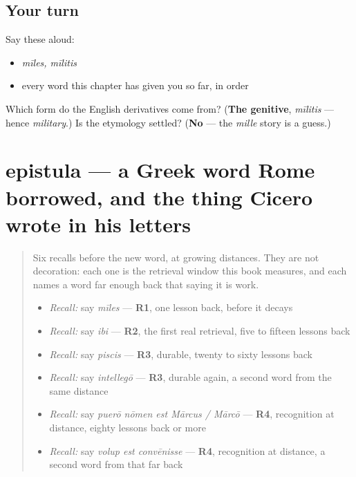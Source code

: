 \subsection*{Your turn}
Say these aloud:

\begin{itemize}
\raggedright
  \item \emph{mīles, mīlitis}
  \item every word this chapter has given you so far, in order
\end{itemize}

\begin{tcolorbox}[breakable,colback=teal!4,colframe=teal!35!black,title={Before you move on}]
Which form do the English derivatives come from? (\textbf{The genitive}, \emph{mīlitis} — hence \emph{military}.) Is the etymology settled? (\textbf{No} — the \emph{mille} story is a guess.)
\end{tcolorbox}
\section[epistula, epistulae]{epistula — a Greek word Rome borrowed, and the thing Cicero wrote in his letters}

\label{lesson:LA-C51-epistula}



\begin{quote}
Six recalls before the new word, at growing distances. They are not decoration: each one is the retrieval window this book measures, and each names a word far enough back that saying it is work.

\begin{itemize}
\raggedright
  \item \emph{Recall:} say \emph{mīles} — \textbf{R1}, one lesson back, before it decays
  \item \emph{Recall:} say \emph{ibi} — \textbf{R2}, the first real retrieval, five to fifteen lessons back
  \item \emph{Recall:} say \emph{piscis} — \textbf{R3}, durable, twenty to sixty lessons back
  \item \emph{Recall:} say \emph{intellegō} — \textbf{R3}, durable again, a second word from the same distance
  \item \emph{Recall:} say \emph{puerō nōmen est Mārcus / Mārcō} — \textbf{R4}, recognition at distance, eighty lessons back or more
  \item \emph{Recall:} say \emph{volup est convēnisse} — \textbf{R4}, recognition at distance, a second word from that far back
\end{itemize}
\end{quote}

